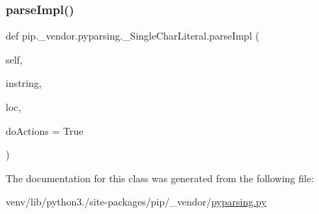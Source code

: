 \subsubsection{\texorpdfstring{parse\+Impl()}{parseImpl()}}
{\footnotesize\ttfamily def pip.\+\_\+vendor.\+pyparsing.\+\_\+\+Single\+Char\+Literal.\+parse\+Impl (\begin{DoxyParamCaption}\item[{}]{self,  }\item[{}]{instring,  }\item[{}]{loc,  }\item[{}]{do\+Actions = {\ttfamily True} }\end{DoxyParamCaption})}



The documentation for this class was generated from the following file\+:\begin{DoxyCompactItemize}
\item 
venv/lib/python3./site-\/packages/pip/\+\_\+vendor/\hyperlink{pip_2__vendor_2pyparsing_8py}{pyparsing.\+py}\end{DoxyCompactItemize}
